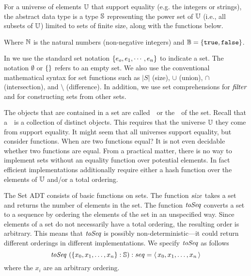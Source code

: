\begin{datatype}[Sets]
\label{XXadt:sets} 
For a universe of elements ${\mathbb{U}}$ that support equality (e.g. the integers or strings), the 
 abstract data type is a type ${\mathbb{S}}$ representing the power 
set of ${\mathbb{U}}$ (i.e., all subsets of ${\mathbb{U}}$) limited to sets of finite 
size, along with the functions below. 
{\normalsize

}
Where $\mathbb{N}$ is 
the natural numbers (non-negative integers) and ${\mathbb{B}} = \{\texttt{true},
\texttt{false}\}$.
\end{datatype}

\begin{syntax}[Sets] 
\label{XXsyn:sets}
In \pml{}  we use the standard set notation $\left\{ e_o,e_1,\cdots,e_n \right\}$ to
  indicate a set.  The notation $\emptyset$ or $\left\{  \right\}$ refers to an
  empty set. We also use the conventional mathematical syntax for set
  functions such as $|S|$ (size), $\cup$ (union), $\cap$
  (intersection), and $\setminus$ (difference).  In addition, we use
  set comprehensions for $\mathit{filter}$ and for constructing sets from
  other sets.
\end{syntax}

\begin{gram}
  The objects that are contained in a set are called~~or the~~of the set.  Recall that a~~is a collection of distinct objects.  This requires that
  the universe ${\mathbb{U}}$ they come from support equality.  It might seem that
  all universes support equality, but consider functions.  When are
  two functions equal?   It is not even decidable whether two
  functions are equal.   From a practical matter, there is no way to
  implement sets without an equality function over potential
  elements.   In fact efficient implementations additionally require
  either a hash function over the elements of ${\mathbb{U}}$ and/or a total ordering.
\end{gram}

\begin{gram}
The Set ADT consists of basic functions on sets.  
%
The function $\mathit{size}$ takes a set and returns the number of elements
in the set.
% 
The function $\mathit{toSeq}$ converts a set to a sequence by ordering the
elements of the set in an unspecified way. 
%
Since elements of a set do not necessarily have a total ordering, the
resulting order is arbitrary.
%
This means that $\mathit{toSeq}$ is possibly non-deterministic---it could
return different orderings in different implementations.
%
We specify $\mathit{toSeq}$ as follows
\[
\mathit{toSeq}~(\{x_0,x_1,\ldots,x_n\} : {\mathbb{S}}): seq = \left\langle\, x_0,x_1,\ldots,x_n \,\right\rangle
\]
where the $x_i$ are an arbitrary ordering. 
\end{gram}


